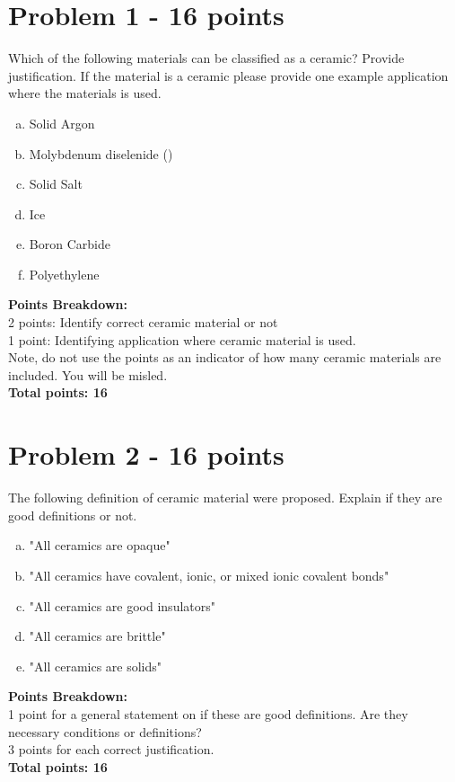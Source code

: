 \documentclass[12pt,letterpaper]{article}
\begin{document}
\section*{Problem 1 - 16 points}
Which of the following materials can be classified as a ceramic? Provide justification. If the material is a ceramic please provide one example application where the materials is used.

\begin{enumerate}[(a)]
    \item Solid Argon
    \item Molybdenum diselenide ()
    \item Solid Salt 
    \item Ice
    \item Boron Carbide 
    \item Polyethylene
\end{enumerate}

\textbf{Points Breakdown:}\\[12pt]
2 points: Identify correct ceramic material or not\\
1 point: Identifying application where ceramic material is used.\\
Note, do not use the points as an indicator of how many ceramic materials are included. You will be misled.\\[6pt]
\textbf{Total points: 16}

\section*{Problem 2 - 16 points} 
The following definition of ceramic material were proposed. Explain if they are good definitions or not.

\begin{enumerate}[(a)]
    \item "All ceramics are opaque"
    \item "All ceramics have covalent, ionic, or mixed ionic covalent bonds"
    \item "All ceramics are good insulators"
    \item "All ceramics are brittle"
    \item "All ceramics are solids"
\end{enumerate}

\textbf{Points Breakdown:}\\[12pt]
1 point for a general statement on if these are good definitions. Are they necessary conditions or definitions?\\
3 points for each correct justification.\\[6pt]
\textbf{Total points: 16}
\end{document}
